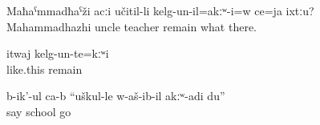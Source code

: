 \begin{exe}
	\ex	\label{ex:Mahammadhazhi was not working as a teacher or what there (in Sanzhi) analytic}
	\gll	Maħaˁmmadħaˁži	acːi	učitil-li	kelg-un-il=akːʷ-i=w	ce=ja	ixtːu?\\
		Mahammadhazhi	uncle	teacher	remain	what	there.\\
	\glt	{} 
	
	\ex	\label{ex:It was not like this analytic}
	\gll	itwaj	kelg-un-te=kːʷi\\
		like.this	remain\\
	\glt	{}

	\ex	\label{ex:‎‎(The wolf) said, I did not go to school analytic}
	\gll	b-ik'-ul	ca-b	``uškul-le	w-aš-ib-il		akːʷ-adi	du''\\
		say		school	go		\\
	\glt	{}

\end{exe}
